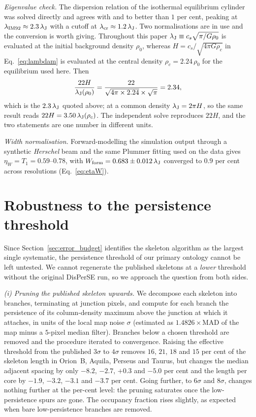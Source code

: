 \documentclass[usenatbib,twoside,twocolumn]{mnras}
\begin{document}
\emph{Eigenvalue check.} The dispersion relation of the isothermal equilibrium cylinder was solved directly and agrees with \citet{Nagasawa1987} and \citet{Fischera2012} to better than $1$ per cent, peaking at $\lambda_{\rm IM92}\approx2.3\,\lambda_{\rm J}$ with a cutoff at $\lambda_{\rm cr}\approx1.2\,\lambda_{\rm J}$. Two normalisations are in use and the conversion is worth giving. Throughout this paper $\lambda_{\rm J}\equiv c_s\sqrt{\pi/G\rho_0}$ is evaluated at the initial background density $\rho_0$, whereas $H=c_s/\sqrt{4\pi G\rho_c}$ in Eq.~\ref{eq:lambdam} is evaluated at the central density $\rho_c=2.24\,\rho_0$ for the equilibrium used here. Then
\begin{equation}
\frac{22H}{\lambda_{\rm J}(\rho_0)}=\frac{22}{\sqrt{4\pi\times2.24}\times\sqrt{\pi}}=2.34,
\label{eq:hconv}
\end{equation}
which is the $2.3\,\lambda_{\rm J}$ quoted above; at a common density $\lambda_{\rm J}=2\pi H$, so the same result reads $22H=3.50\,\lambda_{\rm J}(\rho_c)$. The independent solve reproduces $22H$, and the two statements are one number in different units.

\emph{Width normalisation.} Forward-modelling the simulation output through a synthetic \textit{Herschel} beam and the same Plummer fitting used on the data gives $\eta_W=T_1=0.59$--$0.78$, with $W_{\rm form}=0.683\pm0.012\,\lambda_{\rm J}$ converged to $0.9$ per cent across resolutions (Eq.~\ref{eq:etaW}).

\section{Robustness to the persistence threshold}
\label{sec:persistence}

Since Section~\ref{sec:error_budget} identifies the skeleton algorithm as the largest single systematic, the persistence threshold of our primary ontology cannot be left untested. We cannot regenerate the published skeletons at a \emph{lower} threshold without the original DisPerSE run, so we approach the question from both sides.

\smallskip\noindent\emph{(i) Pruning the published skeleton upwards.} We decompose each skeleton into branches, terminating at junction pixels, and compute for each branch the persistence of its column-density maximum above the junction at which it attaches, in units of the local map noise $\sigma$ (estimated as $1.4826\times$MAD of the map minus a $5$-pixel median filter). Branches below a chosen threshold are removed and the procedure iterated to convergence. Raising the effective threshold from the published $3\sigma$ to $4\sigma$ removes $16$, $21$, $18$ and $15$ per cent of the skeleton length in Orion~B, Aquila, Perseus and Taurus, but changes the median adjacent spacing by only $-8.2$, $-2.7$, $+0.3$ and $-5.0$ per cent and the length per core by $-1.9$, $-3.2$, $-3.1$ and $-3.7$ per cent. Going further, to $6\sigma$ and $8\sigma$, changes nothing further at the per-cent level: the pruning saturates once the low-persistence spurs are gone. The occupancy fraction rises slightly, as expected when bare low-persistence branches are removed.
\end{document}
